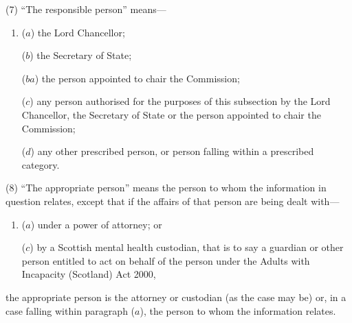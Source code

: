 \documentclass[12pt,a4paper]{article}
\begin{document}
(7) “The responsible person” means—
\begin{enumerate}\item[]
($a$) the Lord Chancellor;

($b$) the Secretary of State;

($ba$) the person appointed to chair the Commission;


($c$) any person authorised for the purposes of this subsection by the Lord Chancellor, the Secretary of State or the person appointed to chair the Commission;

($d$) any other prescribed person, or person falling within a prescribed category.
\end{enumerate}

(8) “The appropriate person” means the person to whom the information in question relates, except that if the affairs of that person are being dealt with—
\begin{enumerate}\item[]
($a$) under a power of attorney;
or  %


($c$) by a Scottish mental health custodian, that is to say
%
a guardian or other person entitled to act on behalf of the person under the Adults with Incapacity (Scotland) Act 2000,  %

%
\end{enumerate}
the appropriate person is the attorney
or custodian  %
(as the case may be) or, in a case falling within paragraph ($a$), the person to whom the information relates.
\end{document}
